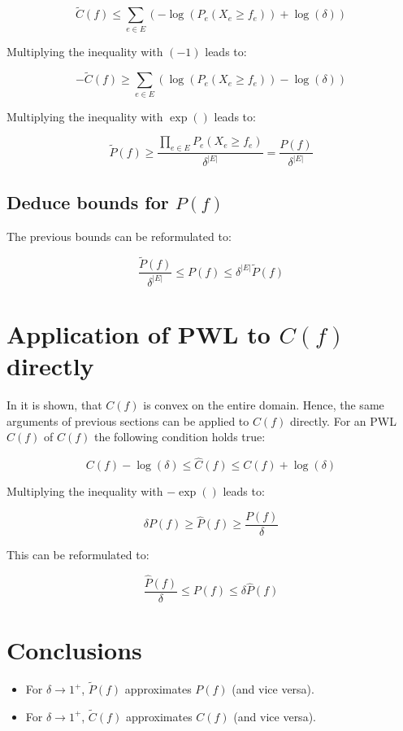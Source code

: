 \documentclass[10pt]{article}
\begin{document}
\[ \tilde{C}(f) \leq \sum_{e\in E}\left(-\log\left(P_e(X_e \geq f_e)\right) + \log(\delta)\right) \]

Multiplying the inequality with $(-1)$ leads to:

\[ -\tilde{C}(f) \geq \sum_{e\in E}\left(\log\left(P_e(X_e \geq f_e)\right) - \log(\delta)\right) \]

Multiplying the inequality with $\exp()$ leads to:

\[ \tilde{P}(f) \geq \frac{\prod_{e\in E}P_e\left(X_{e} \geq f_e\right)}{\delta^{|E|}} = \frac{P(f)}{\delta^{|E|}} \]

\subsection{Deduce bounds for $P(f)$}

The previous bounds can be reformulated to:

\[ \frac{\tilde{P}(f)}{\delta^{|E|}} \leq P(f) \leq \delta^{|E|} \tilde{P}(f) \]

\section{Application of PWL to $C(f)$ directly}

In \cite{DBLP:journals/corr/abs-2107-05322} it is shown, that $C(f)$ is convex on the entire domain. Hence, the same arguments of previous sections can be applied to $C(f)$ directly.
For an PWL $\hat{C}(f)$ of $C(f)$ the following condition holds true:

\[C(f) - \log(\delta) \leq \hat{C}(f) \leq C(f) + \log(\delta)\]

Multiplying the inequality with $-\exp()$ leads to:

\[\delta P(f) \geq \hat{P}(f) \geq \frac{P(f)}{\delta}\]

This can be reformulated to:

\[\frac{\hat{P}(f)}{\delta} \leq P(f) \leq \delta \hat{P}(f)\]

\section{Conclusions}

\begin{itemize}
	\item For $\delta\rightarrow 1^+$, $\tilde{P}(f)$ approximates $P(f)$ (and vice versa).
	\item For $\delta\rightarrow 1^+$, $\tilde{C}(f)$ approximates $C(f)$ (and vice versa).
\end{itemize}
\end{document}
